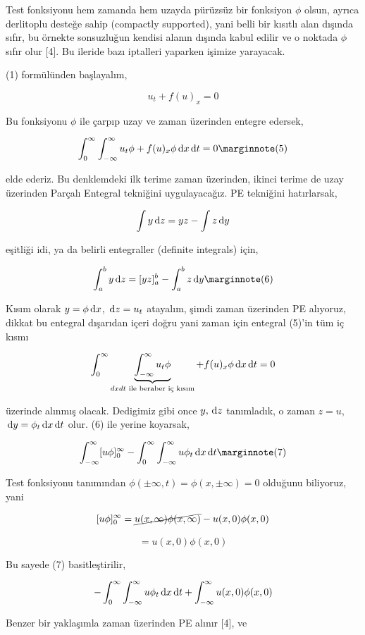\documentclass[12pt,fleqn]{article}\usepackage{../../common}
\begin{document}
Test fonksiyonu hem zamanda hem uzayda pürüzsüz bir fonksiyon $\phi$ olsun,
ayrıca derlitoplu desteğe sahip (compactly supported), yani belli bir kısıtlı
alan dışında sıfır, bu örnekte sonsuzluğun kendisi alanın dışında kabul edilir
ve o noktada $\phi$ sıfır olur [4]. Bu ileride bazı iptalleri yaparken işimize
yarayacak.

(1) formülünden başlayalım,

$$
u_t + f(u)_x = 0
$$

Bu fonksiyonu $\phi$ ile çarpıp uzay ve zaman üzerinden entegre edersek,

$$
\int _{0}^{\infty} \int _{-\infty}^{\infty} u_t \phi + f(u)_x \phi \ud x \ud t = 0
\mlabel{5}
$$

elde ederiz. Bu denklemdeki ilk terime zaman üzerinden, ikinci terime de uzay
üzerinden Parçalı Entegral tekniğini uygulayacağız. PE tekniğini hatırlarsak,

$$
\int y \,\mathrm{d} z = y z - \int z \,\mathrm{d} y
$$

eşitliği idi, ya da belirli entegraller (definite integrals) için,

$$
\int_{a}^{b} y \ud z = [y z]_{a}^{b} - \int_{a}^{b} z \ud y
\mlabel{6}
$$

Kısım olarak $y = \phi \,\mathrm{d} x$, $\,\mathrm{d} z = u_t$ atayalım, şimdi zaman üzerinden PE
alıyoruz, dikkat bu entegral dışarıdan içeri doğru yani zaman için entegral
(5)'in tüm iç kısmı

$$
\int _{0}^{\infty}
\underbrace{\int _{-\infty}^{\infty} u_t \phi}_{dx dt\textrm{ ile beraber iç kısım}} + f(u)_x \phi \,\mathrm{d} x
\,\mathrm{d} t = 0
$$

üzerinde alınmış olacak. Dedigimiz gibi once $y,\,\mathrm{d} z$ tanımladık, o zaman $z=u$,
$\,\mathrm{d} y = \phi_t \,\mathrm{d} x \,\mathrm{d} t$ olur. (6) ile yerine koyarsak,

$$
\int_{-\infty}^{\infty} [ u \phi ]_{0}^{\infty} -
\int _{0}^{\infty} \int_{-\infty}^{\infty} u \phi_t \ud x \ud t
\mlabel{7}
$$

Test fonksiyonu tanımından $\phi(\pm \infty, t) = \phi(x, \pm \infty) = 0$
olduğunu biliyoruz, yani

$$
[ u \phi ]_{0}^{\infty} = \cancel{u(x,\infty)\phi(x,\infty)} - u(x,0)\phi(x,0) 
$$

$$
= u(x,0)\phi(x,0) 
$$

Bu sayede (7) basitleştirilir,

$$
- \int _{0}^{\infty} \int_{-\infty}^{\infty} u \phi_t \,\mathrm{d} x \,\mathrm{d} t +
\int_{-\infty}^{\infty} u(x,0)\phi(x,0) 
$$

Benzer bir yaklaşımla zaman üzerinden PE alınır [4], ve
\end{document}

